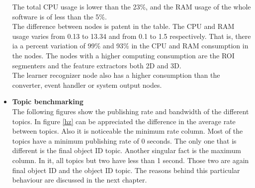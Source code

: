 \begin{itemize}

			The total CPU usage is lower than the 23\%, and the RAM usage of the whole software is of less than the 5\%. 
			\\


			The difference between nodes is patent in the table.
			The CPU and RAM usage varies from  0.13 to 13.34 and from 0.1 to 1.5 respectively. 
			That is, there ia a percent variation of 99\% and  93\%  in the CPU and RAM consumption in the nodes. 
			The nodes with a higher computing consumption are the ROI segmenters and the feature extractors both 2D and 3D.
			\\

			The learner recognizer node also has a higher consumption than the converter, event handler or system output nodes. 
			
			\newpage

		\item{\textbf{Topic benchmarking}}\\

			The following figures show the publishing rate and bandwidth of the different topics. 
			In figure \ref{hz} can be appreciated the difference in the average rate between topics. 
			Also it is noticeable the minimum rate column. 
			Most of the topics have a minimum publishing rate of 0 seconds.
			The only one that is different is the final object ID topic. 
			Another singular fact is the maximum column. 
			In it, all topics but two have less than 1 second. 
			Those two are again final object ID and the object ID topic. 
			The reasons behind this particular behaviour are discussed in the next chapter. 



\end{itemize}
